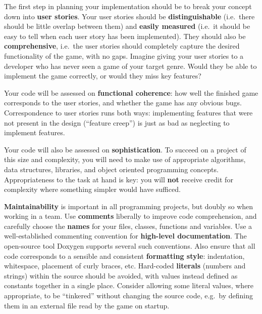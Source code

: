 \documentclass{../fal_assignment}
\begin{document}
The first step in planning your implementation should be to break your concept down into \textbf{user stories}. 
Your user stories should be \textbf{distinguishable} (i.e.\ there should be little overlap between them)
and \textbf{easily measured} (i.e.\ it should be easy to tell when each user story has been implemented).
They should also be \textbf{comprehensive}, i.e.\ the user stories should completely capture the
desired functionality of the game, with no gaps.
Imagine giving your user stories to a developer who has never seen a game of your target genre.
Would they be able to implement the game correctly, or would they miss key features?


Your code will be assessed on \textbf{functional coherence}:
how well the finished game corresponds to the user stories,
and whether the game has any obvious bugs.
Correspondence to user stories runs both ways:
implementing features that were not present in the design (``feature creep'')
is just as bad as neglecting to implement features.

Your code will also be assessed on \textbf{sophistication}.
To succeed on a project of this size and complexity,
you will need to make use of appropriate algorithms, data structures, libraries, and object oriented programming concepts.
Appropriateness to the task at hand is key:
you will \textbf{not} receive credit for complexity  
where something simpler would have sufficed.

\textbf{Maintainability} is important in all programming projects,
but doubly so when working in a team.
Use \textbf{comments} liberally to improve code comprehension,
and carefully choose the \textbf{names} for your files, classes, functions and variables.
Use a well-established commenting convention
for \textbf{high-level documentation}.
The open-source tool Doxygen supports several such conventions.
Also ensure that all code corresponds to a sensible and consistent \textbf{formatting style}:
indentation, whitespace, placement of curly braces, etc.
Hard-coded \textbf{literals} (numbers and strings) within the source should be avoided,
with values instead defined as constants together in a single place.
Consider allowing some literal values, where appropriate, to be ``tinkered'' without changing the source code,
e.g.\ by defining them in an external file read by the game on startup.
\end{document}
